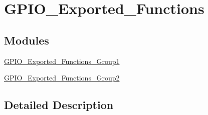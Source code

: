 \hypertarget{group___g_p_i_o___exported___functions}{}\section{G\+P\+I\+O\+\_\+\+Exported\+\_\+\+Functions}
\label{group___g_p_i_o___exported___functions}
\subsection*{Modules}
\begin{DoxyCompactItemize}
\item 
\hyperlink{group___g_p_i_o___exported___functions___group1}{G\+P\+I\+O\+\_\+\+Exported\+\_\+\+Functions\+\_\+\+Group1}
\item 
\hyperlink{group___g_p_i_o___exported___functions___group2}{G\+P\+I\+O\+\_\+\+Exported\+\_\+\+Functions\+\_\+\+Group2}
\end{DoxyCompactItemize}


\subsection{Detailed Description}
